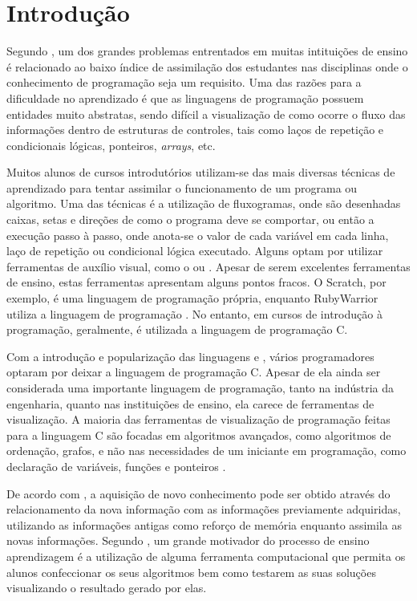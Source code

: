 \documentclass[12pt, %
openright,
oneside, %
a4paper,    %
brazil]{facom-ufu-abntex2}
\begin{document}
\chapter[Introdução]{Introdução}
Segundo \cite{de2004ferramenta}, um dos grandes problemas entrentados em muitas intituições de ensino é relacionado ao baixo índice de assimilação dos estudantes nas disciplinas onde o conhecimento de programação seja um requisito. Uma das razões para a dificuldade no aprendizado é que as linguagens de programação possuem entidades muito abstratas, sendo difícil a visualização de como ocorre o fluxo das informações dentro de estruturas de controles, tais como laços de repetição e condicionais lógicas, ponteiros, \textit{arrays}, etc.

Muitos alunos de cursos introdutórios utilizam-se das mais diversas técnicas de aprendizado para tentar assimilar o funcionamento de um programa ou algoritmo. Uma das técnicas é a utilização de fluxogramas, onde são desenhadas caixas, setas e direções de como o programa deve se comportar, ou então a execução passo à passo, onde anota-se o valor de cada variável em cada linha, laço de repetição ou condicional lógica executado. Alguns optam por utilizar ferramentas de auxílio visual, como o  ou . Apesar de serem excelentes ferramentas de ensino, estas ferramentas apresentam alguns pontos fracos. O Scratch, por exemplo, é uma linguagem de programação própria, enquanto RubyWarrior utiliza a linguagem de programação . No entanto, em cursos de introdução à programação, geralmente, é utilizada a linguagem de programação C.

Com a introdução e popularização das linguagens  e , vários programadores optaram por deixar a linguagem de programação C. Apesar de ela ainda ser considerada uma importante linguagem de programação, tanto na indústria da engenharia, quanto nas instituições de ensino, ela carece de ferramentas de visualização. A maioria das ferramentas de visualização de programação feitas para a linguagem C são focadas em algoritmos avançados, como algoritmos de ordenação, grafos, e não nas necessidades de um iniciante em programação, como declaração de variáveis, funções e ponteiros \cite{kirby2010program}.

De acordo com , a aquisição de novo conhecimento pode ser obtido através do relacionamento da nova informação com as informações previamente adquiridas, utilizando as informações antigas como reforço de memória enquanto assimila as novas informações. Segundo , um grande motivador do processo de ensino aprendizagem é a utilização de alguma ferramenta computacional que permita os alunos confeccionar os seus algoritmos bem como testarem as suas soluções visualizando o resultado gerado por elas.
\end{document}
